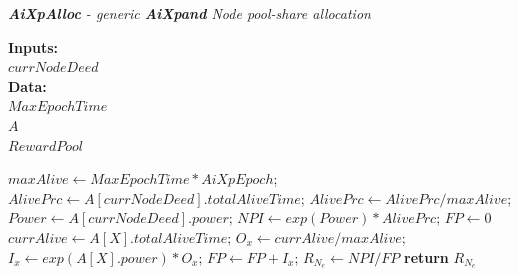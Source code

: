 \documentclass{article}
\begin{document}
\begin{algorithm}
\caption{\textit{\textbf{AiXpAlloc} - generic \textbf{AiXpand} Node pool-share allocation}}\label{alg:joballoc}
\textbf{Inputs:}\\
\hspace*{5mm} $currNodeDeed$  \vspace{1mm}\\
\textbf{Data:}\\
\hspace*{5mm} $MaxEpochTime$  \vspace{1mm}\\
\hspace*{5mm} $A$  \vspace{1mm}\\
\hspace*{5mm} $RewardPool$  \vspace{1mm}\\
\begin{algorithmic}[1]
    \State $maxAlive \gets MaxEpochTime * AiXpEpoch$;\vspace{1mm}
    \State $AlivePrc \gets A[currNodeDeed].totalAliveTime$;\vspace{1mm}
    \State $AlivePrc \gets AlivePrc / maxAlive$;\vspace{1mm}
    \State $Power \gets A[currNodeDeed].power$;\vspace{1mm}
    \State $NPI \gets exp(Power) * AlivePrc$;\vspace{1mm}
    \State $FP \gets 0$\vspace{1mm}
    \vspace{1mm}
        \State $currAlive \gets A[X].totalAliveTime$;\vspace{1mm}
        \State $O_x \gets currAlive/maxAlive$;\vspace{1mm}
        \State $I_x \gets exp(A[X].power) * O_x$;\vspace{1mm}
        \State $FP \gets FP + I_x$;\vspace{1mm}
    \EndFor\vspace{1mm}
    \State $R_{N_e} \gets NPI / FP$\vspace{1mm}
    \State \textbf{return} $R_{N_e}$
\end{algorithmic}
\end{algorithm}
\end{document}
